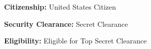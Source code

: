 \noindent\textbf{Citizenship:} United States Citizen

\noindent\textbf{Security Clearance:} Secret Clearance 

\noindent\textbf{Eligibility:} Eligible for Top Secret Clearance